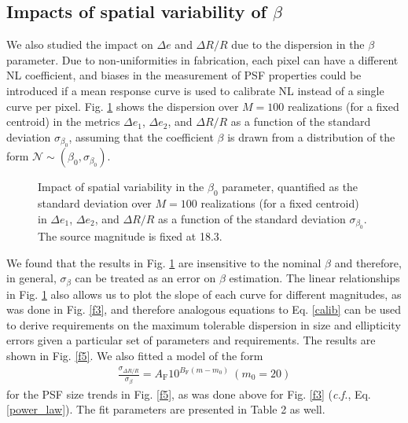 \documentclass[preprint]{aastex}
\begin{document}
\subsection{Impacts of spatial variability of $\beta$}
We also studied the impact on $\Delta e$ and $\Delta R/R$ due to the dispersion in the $\beta$ parameter. Due to non-uniformities in fabrication, each pixel can have a different NL coefficient, and biases in the measurement of PSF properties could be introduced if a mean response curve is used to calibrate NL instead of a single curve per pixel. Fig. \ref{f4} shows the dispersion over $M=100$ realizations (for a fixed centroid) in the metrics $\Delta e_1$,  $\Delta e_2$, and  $\Delta R/R$  as a function of the standard deviation $ \sigma_{\beta_0}$, assuming that the coefficient $\beta$ is drawn from a distribution of the form $\mathcal{N} \sim (\beta_0, \sigma_{\beta_0})$. 

\begin{figure}[!h]
\centering
{}
\caption{Impact of spatial variability in the $\beta_0$ parameter, quantified as the standard deviation over $M=100$ realizations (for a fixed centroid) in $\Delta e_1$,  $\Delta e_2$, and $\Delta R/R$  as a function of the standard deviation $ \sigma_{\beta_0}$. 
The source magnitude is fixed at 18.3.}
\label{f4}
\end{figure}
We found that the results in Fig. \ref{f4} are insensitive to the nominal $\beta$ and therefore, in general, $\sigma_{\beta}$  can be treated as an error on $\beta$ estimation. The linear relationships in Fig. \ref{f4} also allows us to plot the slope of each curve for different magnitudes, as was done in Fig. \ref{f3}, and therefore analogous equations to Eq. \ref{calib} can be used to derive requirements on the maximum tolerable dispersion in size and ellipticity errors given a particular set of parameters and requirements. The results are shown in Fig. \ref{f5}. We also fitted a model of the form 
\begin{align}
\frac{\sigma_{\Delta R/ R}} {\sigma_{\beta}} = A_{\text{F}}10^{B_{\text{F}} (m - m_{0})} \ (m_0 =20)
\end{align}
for the PSF size trends in Fig. \ref{f5}, as was done above for Fig. \ref{f3} (\emph{c.f.}, Eq. \ref{power_law}). The fit parameters are presented in Table 2 as well.  
\end{document}
